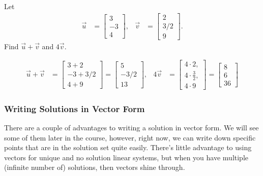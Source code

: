\begin{example}
Let
%
\begin{align*}
\vec{u} & = \begin{bmatrix}
3 \\ -3 \\ 4
\end{bmatrix}, & \vec{v} & = \begin{bmatrix}
2 \\ 3/2 \\ 9
\end{bmatrix}.
\end{align*}
Find $\vec{u}+\vec{v}$ and $4 \vec{v}$.

\solution

\begin{align*}
\vec{u} + \vec{v} & = \begin{bmatrix}
3+2 \\ -3 + 3/2 \\ 4+9
\end{bmatrix} = \begin{bmatrix}
5 \\ -3/2 \\ 13
\end{bmatrix},
&  4 \vec{v} & = \begin{bmatrix}
4 \cdot 2, \\ 4 \cdot \frac{3}{2}, \\ 4 \cdot 9
\end{bmatrix} =
\begin{bmatrix}
8 \\ 6 \\ 36
\end{bmatrix}
\end{align*}
\end{example}

\subsubsection{Writing Solutions in Vector Form}

There are a couple of advantages to writing a solution in vector form.  We will see some of them later in the course,  however, right now, we can write down specific points that are in the solution set quite easily.  There's little advantage to using vectors for unique and no solution linear systems, but when you have multiple (infinite number of) solutions, then vectors shine through.


